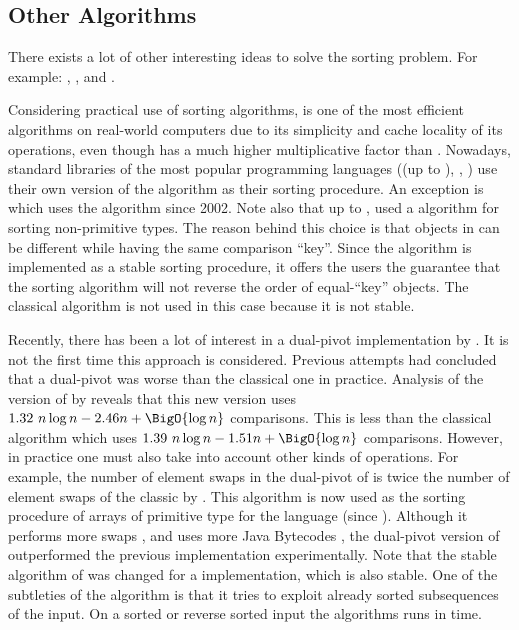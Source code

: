 \subsection*{Other Algorithms}

There exists a lot of other interesting ideas to solve the sorting problem. For
example: \shellsort \cite{shell:1959}, \smoothsort \cite{dijkstra:1982},
\introsort \cite{musser:1997} and \timsort \cite{martelli:2006}.

Considering practical use of sorting algorithms, \quicksort is one of the most
efficient algorithms on real-world computers due to its simplicity and cache
locality of its operations, even though \quicksort has a much higher
multiplicative factor than \mergesort. Nowadays, standard libraries of the most
popular programming languages (\Java (up to ), \CC, \CXX) use their own
version of the \quicksort algorithm as their sorting procedure. An exception is
\Python which uses the \timsort algorithm since 2002. Note also that up to , \Java used a \mergesort algorithm for sorting non-primitive types. The
reason behind this choice is that objects in \Java can be different while
having the same comparison ``key''. Since the \Java \mergesort algorithm is
implemented as a stable sorting procedure, it offers the users the guarantee
that the sorting algorithm will not reverse the order of equal-``key'' objects.
The classical \quicksort algorithm is not used in this case because it is not
stable.

Recently, there has been a lot of interest in a dual-pivot \quicksort
implementation by \citet*{yaroslavskiy:2009}. It is not the first time this
approach is considered. Previous attempts \cite{sedgewick:1980} had concluded
that a dual-pivot \quicksort was worse than the classical one in practice.
Analysis of the version of \citet*{yaroslavskiy:2009} by \citet*{wild:2012}
reveals that this new version uses \(1.32~n \log n - 2.46n + \BigO{\log n}\)
comparisons.  This is less than the classical \quicksort algorithm which uses
\(1.39~n \log n
- 1.51n + \BigO{\log n}\) comparisons. However, in practice one must also take into account
  other kinds of operations. For example, the number of element swaps in the
dual-pivot \quicksort of \citeauthor{yaroslavskiy:2009} is twice the number of
element swaps of the classic \quicksort by \citeauthor{hoare:1962}. This
algorithm is now used as the sorting procedure of arrays of primitive type for
the \Java language (since ). Although it performs more
swaps \cite{wild:2012}, and uses more Java Bytecodes \cite{wild:2013}, the
dual-pivot version of \citet*{yaroslavskiy:2009} outperformed the previous
\quicksort implementation experimentally. Note that the stable \mergesort
algorithm of  was changed for a \timsort implementation, which is
also stable. One of the subtleties of the \timsort algorithm is that it tries
to exploit already sorted subsequences of the input. On a sorted or reverse
sorted input the \timsort algorithms runs in  time.

